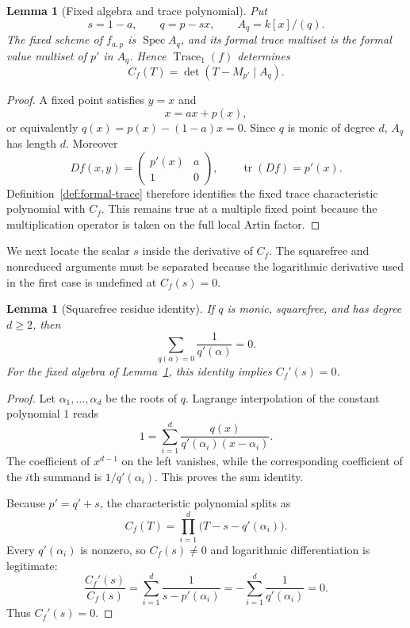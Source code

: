 \documentclass[11pt]{article}
\newtheorem{lemma}[theorem]{Lemma}
\theoremstyle{definition}
\newcommand{\tr}{\operatorname{tr}}
\newcommand{\Trace}{\operatorname{Trace}}
\newcommand{\Spec}{\operatorname{Spec}}
\begin{document}
\begin{lemma}[Fixed algebra and trace polynomial]
\label{lem:fixed-algebra}
Put
\[
s=1-a,
\qquad q=p-sx,
\qquad A_q=k[x]/(q).
\]
The fixed scheme of $f_{a,p}$ is $\Spec A_q$, and its formal trace multiset is the formal value multiset of $p'$ in $A_q$. Hence $\Trace_1(f)$ determines
\[
C_f(T)=\det(T-M_{p'}\mid A_q).
\]
\end{lemma}

\begin{proof}
A fixed point satisfies $y=x$ and
\[
x=ax+p(x),
\]
or equivalently $q(x)=p(x)-(1-a)x=0$. Since $q$ is monic of degree $d$, $A_q$ has length $d$. Moreover
\begin{equation}
Df(x,y)=
\begin{pmatrix}
p'(x)&a\\
1&0
\end{pmatrix},
\qquad
\tr(Df)=p'(x).
\label{eq:first-derivative}
\end{equation}
Definition~\ref{def:formal-trace} therefore identifies the fixed trace characteristic polynomial with $C_f$. This remains true at a multiple fixed point because the multiplication operator is taken on the full local Artin factor.
\end{proof}

We next locate the scalar $s$ inside the derivative of $C_f$. The squarefree and nonreduced arguments must be separated because the logarithmic derivative used in the first case is undefined at $C_f(s)=0$.

\begin{lemma}[Squarefree residue identity]
\label{lem:squarefree}
If $q$ is monic, squarefree, and has degree $d\ge2$, then
\[
\sum_{q(\alpha)=0}\frac{1}{q'(\alpha)}=0.
\]
For the fixed algebra of Lemma~\ref{lem:fixed-algebra}, this identity implies $C_f'(s)=0$.
\end{lemma}

\begin{proof}
Let $\alpha_1,\ldots,\alpha_d$ be the roots of $q$. Lagrange interpolation of the constant polynomial $1$ reads
\begin{equation}
1=
\sum_{i=1}^d
\frac{q(x)}{q'(\alpha_i)(x-\alpha_i)}.
\label{eq:lagrange-one}
\end{equation}
The coefficient of $x^{d-1}$ on the left vanishes, while the corresponding coefficient of the $i$th summand is $1/q'(\alpha_i)$. This proves the sum identity.

Because $p'=q'+s$, the characteristic polynomial splits as
\[
C_f(T)=\prod_{i=1}^d\bigl(T-s-q'(\alpha_i)\bigr).
\]
Every $q'(\alpha_i)$ is nonzero, so $C_f(s)\ne0$ and logarithmic differentiation is legitimate:
\[
\frac{C_f'(s)}{C_f(s)}
=
\sum_{i=1}^d\frac{1}{s-p'(\alpha_i)}
=-
\sum_{i=1}^d\frac{1}{q'(\alpha_i)}
=0.
\]
Thus $C_f'(s)=0$.
\end{proof}
\end{document}

